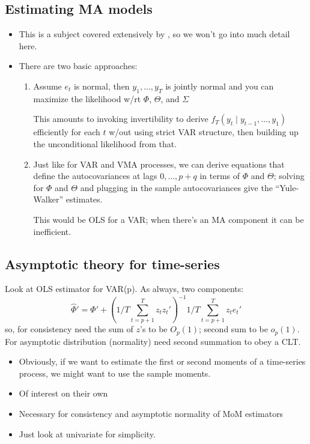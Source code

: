 \subsection{Estimating MA models}

\begin{itemize}
\item This is a subject covered extensively by \citet{Ha94}, so we won't go
  into much detail here.
\item There are two basic approaches:
  \begin{enumerate}
  \item Assume $e_t$ is normal, then $y_1,\dots,y_T$ is jointly normal
    and you can maximize the likelihood w/rt $\Phi$, $\Theta$, and
    $\Sigma$

    This amounts to invoking invertibility to derive $f_T(y_t ∣
    y_{t-1},\dots,y_1)$ efficiently for each $t$ w/out using strict
    VAR structure, then building up the unconditional likelihood from
    that.

  \item Just like for VAR and VMA processes, we can derive equations
    that define the autocovariances at lags $0,\dots,p+q$ in terms of
    $\Phi$ and $\Theta$; solving for $\Phi$ and $\Theta$ and plugging
    in the sample autocovariances give the ``Yule-Walker'' estimates.

    This would be OLS for a VAR; when there's an MA component it can
    be inefficient.
  \end{enumerate}
\end{itemize}

\subsection{Asymptotic theory for time-series}

Look at OLS estimator for VAR(p). As always, two components:
\[\hat \Phi' = \Phi' + (1/T \sum_{t=p+1}^T z_t z_t')^{-1} 1/T
\sum_{t=p+1}^T z_t e_t'\] so, for consistency need the sum of $z$'s to be
$O_p(1)$; second sum to be $o_p(1)$. For asymptotic distribution
(normality) need second summation to obey a CLT.

\begin{itemize}
\item Obviously, if we want to estimate the first or second moments of
  a time-series process, we might want to use the sample moments.
\item Of interest on their own
\item Necessary for consistency and asymptotic normality of MoM
  estimators
\item Just look at univariate for simplicity.
\end{itemize}

